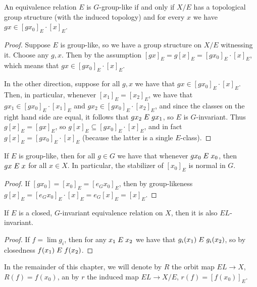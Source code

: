 	\begin{prop}
		An equivalence relation $E$ is $G$-group-like if and only if $X/E$ has a topological group structure (with the induced topology) and for every $x$ we have $gx\in [gx_0]_E\cdot [x]_E$.
	\end{prop}
	\begin{proof}
		Suppose $E$ is group-like, so we have a group structure on $X/E$ witnessing it. Choose any $g,x$. Then by the assumption $[gx]_E=g[x]_E=[gx_0]_E\cdot [x]_E$, which means that $gx\in [gx_0]_E\cdot [x]_E$.
		
		In the other direction, suppose for all $g,x$ we have that $gx\in [gx_0]_E\cdot [x]_E$. Then, in particular, whenever $[x_1]_E=[x_2]_E$, we have that $gx_1\in [gx_0]_E\cdot [x_1]_E$ and $gx_2\in [gx_0]_E\cdot[x_2]_E$, and since the classes on the right hand side are equal, it follows that $gx_2\mathrel{E} gx_1$, so $E$ is $G$-invariant. Thus $g[x]_E=[gx]_E$, so $g [x]_E\subseteq [gx_0]_E\cdot [x]_E$, and in fact $g[x]_E=[gx_0]_E\cdot [x]_E$ (because the latter is a single $E$-class).
	\end{proof}
	
	\begin{prop}
		If $E$ is group-like, then for all $g\in G$ we have that whenever $gx_0\mathrel{E} x_0$, then $gx\mathrel{E} x$ for all $x\in X$. In particular, the stabilizer of $[x_0]_E$ is normal in $G$.
	\end{prop}
	\begin{proof}
		If $[gx_0]=[x_0]_E=[e_G x_0]_E$, then by group-likeness $g [x]_E=[e_G x_0]_E\cdot [x]_E=e_G[x]_E=[x]_E$.
	\end{proof}
	
	\begin{prop}
		\label{prop:closed_invariant}
		If $E$ is a closed, $G$-invariant equivalence relation on $X$, then it is also $EL$-invariant.
	\end{prop}
	\begin{proof}
		If $f=\lim g_i$, then for any $x_1 \mathrel{E} x_2$ we have that $g_i(x_1)\mathrel{E} g_i(x_2)$, so by closedness $f(x_1)\mathrel{E} f(x_2)$.
	\end{proof}
	
	\begin{dfn}
		In the remainder of this chapter, we will denote by $R$ the orbit map $EL\to X$, $R(f)=f(x_0)$, an by $r$ the induced map $EL\to X/E$, $r(f)=[f(x_0)]_E$.\xqed{\lozenge}
	\end{dfn}
	
